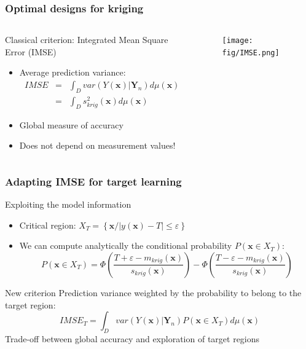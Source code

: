 \documentclass[10pt]{beamer}
\begin{document}
\frame
{
\frametitle{Optimal designs for kriging}
\begin{columns}[t]
\begin{column}{6cm}
\begin{block}{Classical criterion: Integrated Mean Square Error (IMSE)}
\begin{itemize}
 \item Average prediction variance:
 \begin{eqnarray}
  IMSE &=& \int_D var(Y(\mathbf{x}) | \mathbf{Y}_n) d\mu(\mathbf{x}) \nonumber \\
       &=& \int_D s_{krig}^2(\mathbf{x}) d\mu(\mathbf{x}) \nonumber
  \end{eqnarray}
 
  \item Global measure of accuracy
 \item Does not depend on measurement values!
\end{itemize}
\end{block}

\end{column}

\begin{column}{6cm}
\begin{figure}
	\centering
		\texttt{[image: fig/IMSE.png]}
\end{figure}	

\end{column}
\end{columns}
}

\frame
{
\frametitle{Adapting IMSE for target learning}
\begin{block}{Exploiting the model information}
\begin{itemize}
	\item Critical region: $X_T = \left\{ \mathbf{x} / \left| y(\mathbf{x}) - T  \right| \leq \varepsilon \right\}$
	\item We can compute analytically the conditional probability $P\left(\mathbf{x} \in X_T \right)$:
	$$P\left(\mathbf{x} \in X_T \right) = \Phi \left( \frac{T + \varepsilon - m_{krig}(\mathbf{x})}{s_{krig}(\mathbf{x})} \right) - \Phi \left( \frac{T - \varepsilon - m_{krig}(\mathbf{x})}{s_{krig}(\mathbf{x})} \right)$$
\end{itemize}
\end{block}

\begin{block}{New criterion}
Prediction variance weighted by the probability to belong to the target region:
$$IMSE_T = \int_D var(Y(\mathbf{x}) | \mathbf{Y}_n) P\left(\mathbf{x} \in X_T \right)d\mu(\mathbf{x})$$
Trade-off between global accuracy and exploration of target regions
\end{block}
}
\end{document}
